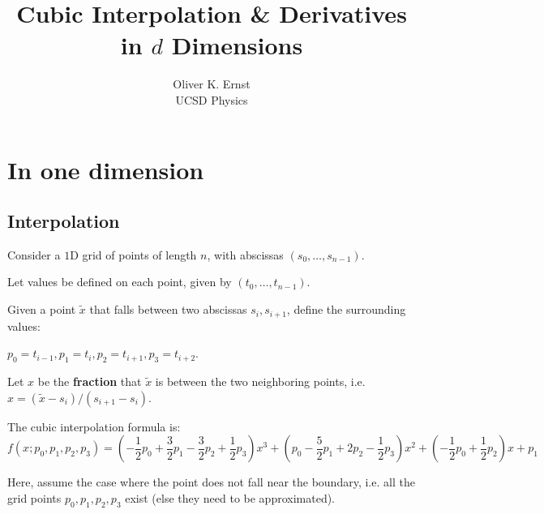 \documentclass[11pt]{article}
\title{Cubic Interpolation \& Derivatives in $d$ Dimensions}
\author{Oliver K. Ernst \\ UCSD Physics}
\begin{document}
\maketitle

\tableofcontents


\section{In one dimension}



\subsection{Interpolation}


Consider a $1$D grid of points of length $n$, with abscissas $(s_0, \dots, s_{n-1})$.

Let values be defined on each point, given by $(t_0,\dots,t_{n-1})$.

Given a point $\tilde{x}$ that falls between two abscissas $s_i, s_{i+1}$, define the surrounding values:

$p_0 = t_{i-1}, p_1 = t_i, p_2 = t_{i+1}, p_3 = t_{i+2}$. 

Let $x$ be the \textbf{fraction} that $\tilde{x}$ is between the two neighboring points, i.e. $x = (\tilde{x} - s_i) / (s_{i+1} - s_i)$.

The cubic interpolation formula is:
\begin{equation}
f(x ; p_0, p_1, p_2, p_3) = \left ( - \frac{1}{2} p_0 + \frac{3}{2} p_1 - \frac{3}{2} p_2 + \frac{1}{2} p_3 \right ) x^3 + \left ( p_0 - \frac{5}{2} p_1 + 2 p_2 - \frac{1}{2} p_3 \right ) x^2 + \left ( - \frac{1}{2} p_0 + \frac{1}{2} p_2 \right ) x + p_1
\end{equation}

Here, assume the case where the point does not fall near the boundary, i.e. all the grid points $p_0,p_1,p_2,p_3$ exist (else they need to be approximated).
\end{document}
